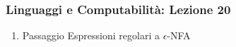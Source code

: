




\begin{frame}[fragile]
	\frametitle{Linguaggi e Computabilità: Lezione 20}
\begin{enumerate}
\item
Passaggio Espressioni regolari a $\epsilon$-NFA
\end{enumerate}
\end{frame}



